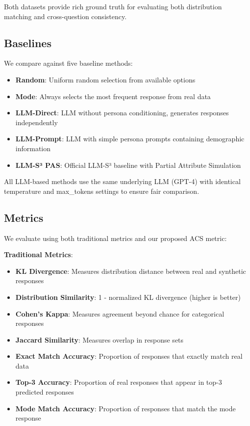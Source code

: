 \documentclass[sigconf, anonymous]{acmart}
\begin{document}
Both datasets provide rich ground truth for evaluating both distribution matching and cross-question consistency.

\subsection{Baselines}

We compare against five baseline methods:

\begin{itemize}
    \item \textbf{Random}: Uniform random selection from available options
    \item \textbf{Mode}: Always selects the most frequent response from real data
    \item \textbf{LLM-Direct}: LLM without persona conditioning, generates responses independently
    \item \textbf{LLM-Prompt}: LLM with simple persona prompts containing demographic information
    \item \textbf{LLM-S³ PAS}: Official LLM-S³ baseline with Partial Attribute Simulation
\end{itemize}

All LLM-based methods use the same underlying LLM (GPT-4) with identical temperature and max_tokens settings to ensure fair comparison.

\subsection{Metrics}

We evaluate using both traditional metrics and our proposed ACS metric:

\textbf{Traditional Metrics}:
\begin{itemize}
    \item \textbf{KL Divergence}: Measures distribution distance between real and synthetic responses
    \item \textbf{Distribution Similarity}: 1 - normalized KL divergence (higher is better)
    \item \textbf{Cohen's Kappa}: Measures agreement beyond chance for categorical responses
    \item \textbf{Jaccard Similarity}: Measures overlap in response sets
    \item \textbf{Exact Match Accuracy}: Proportion of responses that exactly match real data
    \item \textbf{Top-3 Accuracy}: Proportion of real responses that appear in top-3 predicted responses
    \item \textbf{Mode Match Accuracy}: Proportion of responses that match the mode response
\end{itemize}
\end{document}
